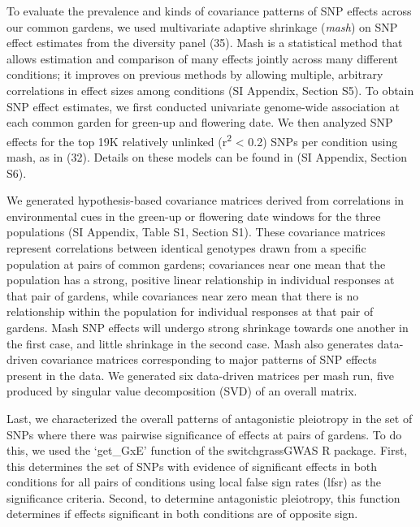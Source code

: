 \documentclass[
  9pt,
  twocolumn,
  twoside]{pnas-new}
\begin{document}
To evaluate the prevalence and kinds of covariance patterns of SNP
effects across our common gardens, we used multivariate adaptive
shrinkage (\emph{mash}) on SNP effect estimates from the diversity panel
(35). Mash is a statistical method that allows estimation and comparison
of many effects jointly across many different conditions; it improves on
previous methods by allowing multiple, arbitrary correlations in effect
sizes among conditions (SI Appendix, Section S5). To obtain SNP effect
estimates, we first conducted univariate genome-wide association at each
common garden for green-up and flowering date. We then analyzed SNP
effects for the top 19K relatively unlinked (r\textsuperscript{2}
\textless{} 0.2) SNPs per condition using mash, as in (32). Details on
these models can be found in (SI Appendix, Section S6).

We generated hypothesis-based covariance matrices derived from
correlations in environmental cues in the green-up or flowering date
windows for the three populations (SI Appendix, Table S1, Section S1).
These covariance matrices represent correlations between identical
genotypes drawn from a specific population at pairs of common gardens;
covariances near one mean that the population has a strong, positive
linear relationship in individual responses at that pair of gardens,
while covariances near zero mean that there is no relationship within
the population for individual responses at that pair of gardens. Mash
SNP effects will undergo strong shrinkage towards one another in the
first case, and little shrinkage in the second case. Mash also generates
data-driven covariance matrices corresponding to major patterns of SNP
effects present in the data. We generated six data-driven matrices per
mash run, five produced by singular value decomposition (SVD) of an
overall matrix.

Last, we characterized the overall patterns of antagonistic pleiotropy
in the set of SNPs where there was pairwise significance of effects at
pairs of gardens. To do this, we used the `get\_GxE' function of the
switchgrassGWAS R package. First, this determines the set of SNPs with
evidence of significant effects in both conditions for all pairs of
conditions using local false sign rates (lfsr) as the significance
criteria. Second, to determine antagonistic pleiotropy, this function
determines if effects significant in both conditions are of opposite
sign.
\end{document}
